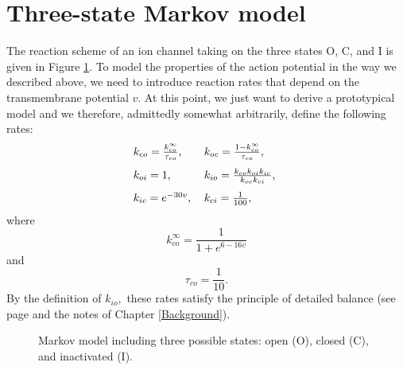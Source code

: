 \section{Three-state Markov model}
The reaction scheme of an ion channel taking on the three states O, C, and I
is given in Figure \ref{Ionchannels_L:ICO}. To model the properties of the action
potential in the way we described above, we need to introduce reaction rates
that depend on the transmembrane potential $v$. At this point, we just want to
derive a prototypical model and we therefore, admittedly somewhat arbitrarily,
define the following rates:
\begin{equation}
\begin{tabular}
[c]{ll}
$k_{co}=\frac{k_{co}^{\infty}}{\tau_{co}}$, & $k_{oc}=\frac{1-k_{co}^{\infty}
}{\tau_{co}}$,\\[3 mm]
$k_{oi}=1$, & $k_{io}=\frac{k_{co}k_{oi}k_{ic}}{k_{oc}k_{ci}}$,\\[3 mm]
$k_{ic}=e^{-30v}$, & $k_{ci}=\frac{1}{100}$,
\end{tabular}
\ \label{ratesv}
\end{equation}
where
\[
k_{co}^{\infty}  =\frac{1}{1+e^{6-16v}}
\]
and
\[
\tau_{co}  =\frac{1}{10}.
\]
By the definition of $k_{io},$ these rates satisfy the principle of detailed
balance (see page \pageref{db} and the notes of Chapter \ref{Background}).


\begin{figure}[ptb]
\begin{center}
\end{center}
\caption{Markov model including three possible states: open (O), closed (C), and
inactivated (I).}
\label{Ionchannels_L:ICO}
\end{figure}


